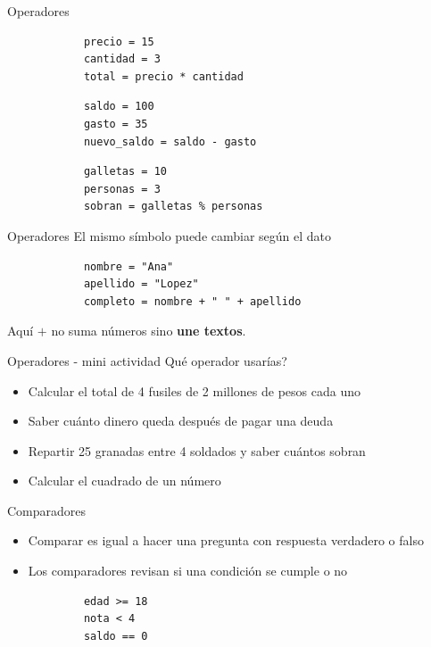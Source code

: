 \documentclass{beamer}
\begin{document}
    \begin{frame}[fragile,t]{Operadores}
        \begin{verbatim}
            precio = 15
            cantidad = 3
            total = precio * cantidad
        \end{verbatim}
        
        \begin{verbatim}
            saldo = 100
            gasto = 35
            nuevo_saldo = saldo - gasto
        \end{verbatim}
        
        \begin{verbatim}
            galletas = 10
            personas = 3
            sobran = galletas % personas
        \end{verbatim}
    \end{frame}

    \begin{frame}[fragile,t]{Operadores}
        El mismo símbolo puede cambiar según el dato
        \begin{verbatim}
            nombre = "Ana"
            apellido = "Lopez"
            completo = nombre + " " + apellido
        \end{verbatim}
        Aquí $+$ no suma números sino \textbf{une textos}.
    \end{frame}

    \begin{frame}{Operadores - mini actividad}
        Qué operador usarías?
        \begin{itemize}
            \item Calcular el total de 4 fusiles de 2 millones de pesos cada uno
            \item Saber cuánto dinero queda después de pagar una deuda
            \item Repartir 25 granadas entre 4 soldados y saber cuántos sobran
            \item Calcular el cuadrado de un número
        \end{itemize}
    \end{frame}

    \begin{frame}[fragile,t]{Comparadores}
        \begin{itemize}
            \item Comparar es igual a hacer una pregunta con respuesta verdadero o falso
            \item Los comparadores revisan si una condición se cumple o no
        \end{itemize}
        \centering
        \begin{verbatim}
            edad >= 18
            nota < 4
            saldo == 0
        \end{verbatim}
    \end{frame}
\end{document}
